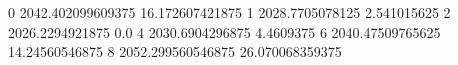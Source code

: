 0 2042.402099609375 16.172607421875
1 2028.7705078125 2.541015625
2 2026.2294921875 0.0
4 2030.6904296875 4.4609375
6 2040.47509765625 14.24560546875
8 2052.299560546875 26.070068359375
